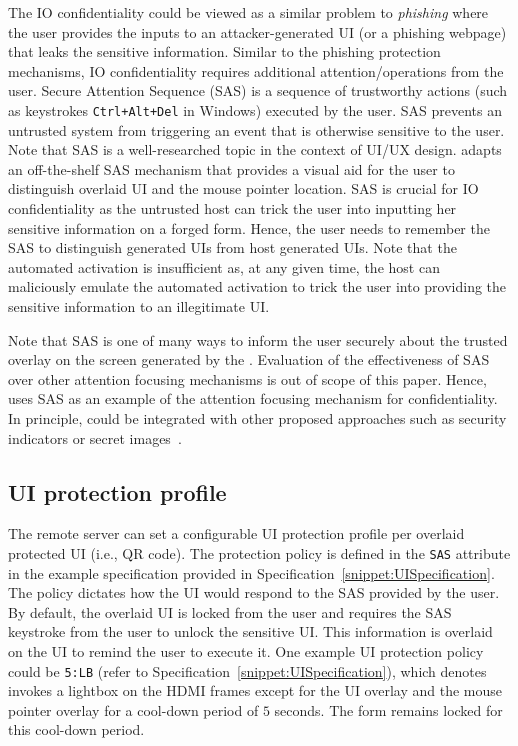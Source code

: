 The IO confidentiality could be viewed as a similar problem to \emph{phishing} where the user provides the inputs to an attacker-generated UI (or a phishing webpage) that leaks the sensitive information. Similar to the phishing protection mechanisms, IO confidentiality requires additional attention/operations from the user. Secure Attention Sequence (SAS) is a sequence of trustworthy actions (such as keystrokes \texttt{Ctrl+Alt+Del} in Windows) executed by the user. SAS prevents an untrusted system from triggering an event that is otherwise sensitive to the user. Note that SAS is a well-researched topic in the context of UI/UX design. \name adapts an off-the-shelf SAS mechanism that provides a visual aid for the user to distinguish overlaid UI and the mouse pointer location. SAS is crucial for IO confidentiality as the untrusted host can trick the user into inputting her sensitive information on a forged form. Hence, the user needs to remember the SAS to distinguish \device generated UIs from host generated UIs. Note that the automated activation is insufficient as, at any given time, the host can maliciously emulate the automated activation to trick the user into providing the sensitive information to an illegitimate UI.

Note that SAS is one of many ways to inform the user securely about the trusted overlay on the screen generated by the \device. Evaluation of the effectiveness of SAS over other attention focusing mechanisms is out of scope of this paper. Hence, \name uses SAS as an example of the attention focusing mechanism for confidentiality. In principle, \name could be integrated with other proposed approaches such as security indicators or secret images~\cite{6894474,Marforio2016}.


\subsection{UI protection profile} The remote server can set a configurable UI protection profile per overlaid protected UI (i.e., QR code). The protection policy is defined in the \texttt{SAS} attribute in the example specification provided in Specification~\ref{snippet:UISpecification}. The policy dictates how the UI would respond to the SAS provided by the user. By default, the overlaid UI is locked from the user and requires the SAS keystroke from the user to unlock the sensitive UI. This information is overlaid on the UI to remind the user to execute it. One example UI protection policy could be \texttt{5:LB} (refer to Specification~\ref{snippet:UISpecification}), which denotes \device invokes a lightbox on the HDMI frames except for the UI overlay and the mouse pointer overlay for a cool-down period of $5$ seconds. The form remains locked for this cool-down period.

